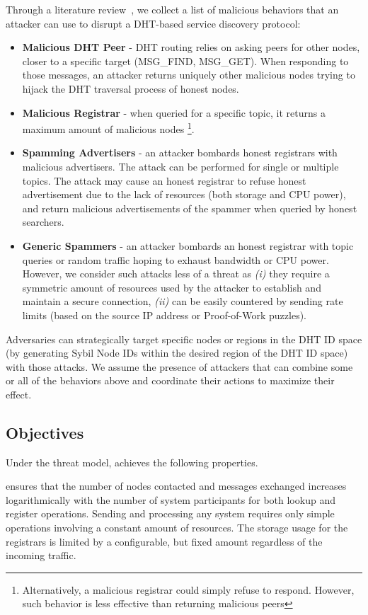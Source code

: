Through a literature review~\cite{chen2020survey, henningsen2019eclipsing}, we collect a list of malicious behaviors that an attacker can use to disrupt a DHT-based service discovery protocol:
\begin{itemize}
    \item \textbf{Malicious DHT Peer} - DHT routing relies on asking peers for other nodes, closer to a specific target (\eg MSG\_FIND, MSG\_GET). When responding to those messages, an attacker returns uniquely other malicious nodes trying to hijack the DHT traversal process of honest nodes.
    \item \textbf{Malicious Registrar} - when queried for a specific topic, it returns a maximum amount of malicious nodes \footnote{Alternatively, a malicious registrar could simply refuse to respond. However, such behavior is less effective than returning malicious peers}. 
    \item \textbf{Spamming Advertisers} - an attacker bombards honest registrars with malicious advertisers. The attack can be performed for single or multiple topics. The attack may cause an honest registrar to refuse honest advertisement due to the lack of resources (both storage and CPU power), and return malicious advertisements of the spammer when queried by honest searchers. 
    \item \textbf{Generic Spammers} - an attacker bombards an honest registrar with topic queries or random traffic hoping to exhaust bandwidth or CPU power. However, we consider such attacks less of a threat as \textit{(i)} they require a symmetric amount of resources used by the attacker to establish and maintain a secure connection, \textit{(ii)} can be easily countered by sending rate limits (\eg based on the source IP address or Proof-of-Work puzzles). 
\end{itemize}

Adversaries can strategically target specific nodes or regions in the DHT ID space (\ie by generating Sybil Node IDs within the desired region of the DHT ID space) with those attacks. We assume the presence of attackers that can combine some or all of the behaviors above and coordinate their actions to maximize their effect. 

\subsection{Objectives}
Under the threat model, \sysname achieves the following properties.

 \sysname ensures that the number of nodes contacted and messages exchanged increases logarithmically with the number of system participants for both lookup and register operations. Sending and processing any system requires only simple operations involving a constant amount of resources. The storage usage for the registrars is limited by a configurable, but fixed amount regardless of the incoming traffic. 

